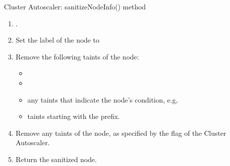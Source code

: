 \begin{algorithm}[H]
\caption{Cluster Autoscaler: sanitizeNodeInfo() method}\label{alg:sanitize-template}
\begin{enumerate}
    \tightlist
    \item {} \lar {}.
    \item Set the  label of the node to 
    \item Remove the following taints of the node:
      \begin{itemize}
        \tightlist
        \item {}
        \item {}
        \item any taints that indicate the node's condition, e.g,
      \item taints starting with the  prefix.
      \end{itemize}
    \item Remove any taints of the node, as specified by the  flag of the Cluster Autoscaler.
    \item Return the sanitized node.
\end{enumerate}
\end{algorithm}